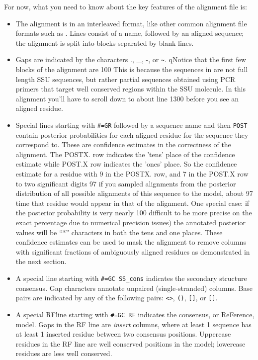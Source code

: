For now, what you need to know about the key features of the alignment file is:
\begin{itemize}

\item The alignment is in an interleaved format, like other
  common alignment file formats such as .
  Lines consist of a name, followed by an aligned sequence;
  the alignment is split into blocks separated by blank lines.

\item Gaps are indicated by the characters ., \_, -, or \verb+~+.
  qNotice that the first few blocks of the alignment are 100%
  This is because the sequences in  are not full length
  SSU sequences, but rather partial sequences obtained using PCR
  primers that target well conserved regions within the SSU
  molecule. In this alignment you'll have to scroll down to about line
  1300 before you see an aligned residue.

\item Special lines starting with {\small\verb+#=GR+} followed by a
  sequence name and then {\small\verb+POST+} contain posterior
  probabilities for each aligned residue for the sequence they
  correspond to. These are confidence estimates in the correctness of
  the alignment.  The POSTX. row indicates the ’tens’ place of the
  confidence estimate while POST.X row indicates the ’ones’ place. So
  the confidence estimate for a residue with 9 in the POSTX. row, and
  7 in the POST.X row to two significant digits 97%
  if you sampled alignments from the posterior distribution of all
  possible alignments of this sequence to the model, about 97%
  time that residue would appear in that of the alignment. One special
  case: if the posterior probability is very nearly 100%
  difficult to be more precise on the exact percentage due to
  numerical precision issues) the annotated posterior values will be
  ``*'' characters in both the tens and one places. These confidence
  estimates can be used to mask the alignment to remove columns with
  significant fractions of ambiguously aligned residues as demonstrated
  in the next section.

\item A special line starting with {\small\verb+#=GC SS_cons+}
  indicates the secondary structure consensus. Gap characters annotate
  unpaired (single-stranded) columns. Base pairs are indicated by any
  of the following pairs: \verb+<>+, \verb+()+, \verb+[]+, or
  \verb+[]+.

\item A special \"RF\" line starting with {\small\verb+#=GC RF+}
  indicates the consensus, or ReFerence, model. Gaps in the RF line
  are \emph{insert} columns, where at least 1 sequence has at least 1
  inserted residue between two consensus positions. Uppercase residues
  in the RF line are well conserved positions in the model; lowercase
  residues are less well conserved.
\end{itemize}

